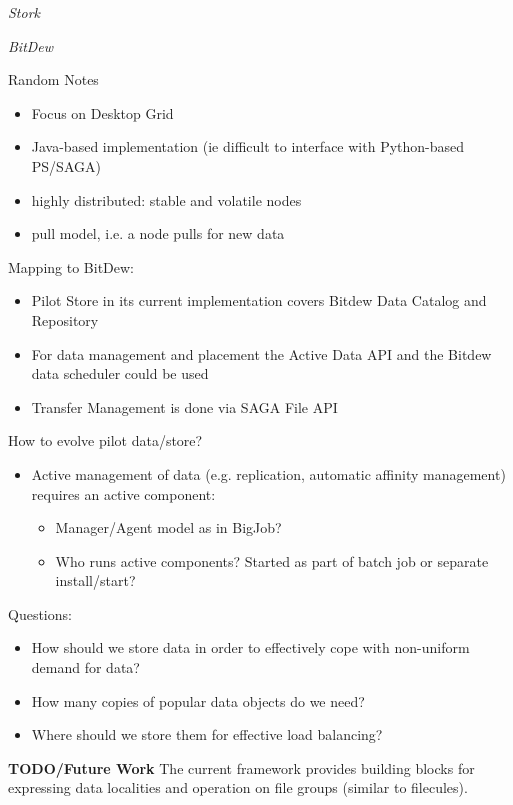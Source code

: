 \documentclass[conference,final]{IEEEtran}
\begin{document}
\emph{Stork}


\emph{BitDew}

Random Notes
\begin{itemize}
	\item Focus on Desktop Grid
	\item Java-based implementation (ie difficult to interface with Python-based PS/SAGA)
	\item highly distributed: stable and volatile nodes
	\item pull model, i.e. a node pulls for new data
\end{itemize}


Mapping to BitDew:
\begin{itemize}
	\item Pilot Store in its current implementation covers Bitdew Data Catalog and Repository
	\item For data management and placement the Active Data API and the Bitdew data scheduler could be used
	\item Transfer Management is done via SAGA File API	
\end{itemize}

How to evolve pilot data/store?
\begin{itemize}
	\item Active management of data (e.g. replication, automatic affinity management) requires an active component:
	\begin{itemize}
		\item Manager/Agent model as in BigJob?
		\item Who runs active components? Started as part of batch job or separate install/start?
	\end{itemize}
\end{itemize}

Questions:
\begin{itemize}
    \item How should
    we store data in order to effectively cope with non-uniform demand for
    data? 
    \item How many copies of popular data objects do we need? 
    \item Where should we store them for effective load balancing?
\end{itemize}

\textbf{TODO/Future Work}
The current framework provides building blocks for expressing data localities and operation on file groups (similar to filecules).
\end{document}
